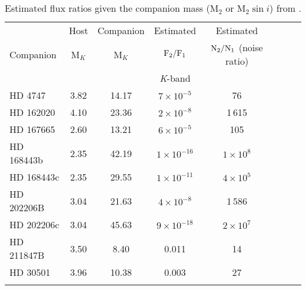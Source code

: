\begin{table*}
         \small
        \centering
        \caption{Estimated flux ratios given the companion mass (\(\textrm{M}_{2}\) or \(\textrm{M}_{2} \sin{i}\)) from .} 
        \begin{tabular}{l c c c c c c c}%
            \toprule
            & Host& Companion & Estimated & Estimated & \\  %
            Companion & M\(_{K}\) & M\(_{K}\) & \(\rm F_{2}/F_{1} \) & \(\rm N_{2}/N_{1} \) (noise ratio) \\
            & & & \textit{K}-band & \\
            \midrule
            {HD 4747} & 3.82 & 14.17 & \(7\times10^{-5} \) & 76 \\  %
            {HD 162020} & 4.10 & 23.36 & \(2\times10^{-8} \) & 1\,615 \\  %
            {HD 167665} & 2.60 & 13.21 & \(6\times10^{-5} \) & 105 \\  %
            {HD 168443b} & 2.35 & 42.19 & \(1\times10^{-16} \) & \(1\times10^{8} \) \\ 
            {HD 168443c} & 2.35 & 29.55 & \(1\times10^{-11} \) & \(4\times10^{5} \) \\  %
            {HD 202206}B & 3.04& 21.63 & \(4\times10^{-8} \) & 1\,586 \\  %
            {HD 202206}c & 3.04& 45.63 & \(9\times10^{-18}\) & \(2\times10^{7} \) \\  %
            {HD 211847}B & 3.50 & 8.40 & 0.011 & 14 \\  %
            {HD 30501} & 3.96 & 10.38 & 0.003 & 27 \\
            \bottomrule& & 
        \end{tabular}
            \label{tab:estimated_flux_ratios}

\end{table*}